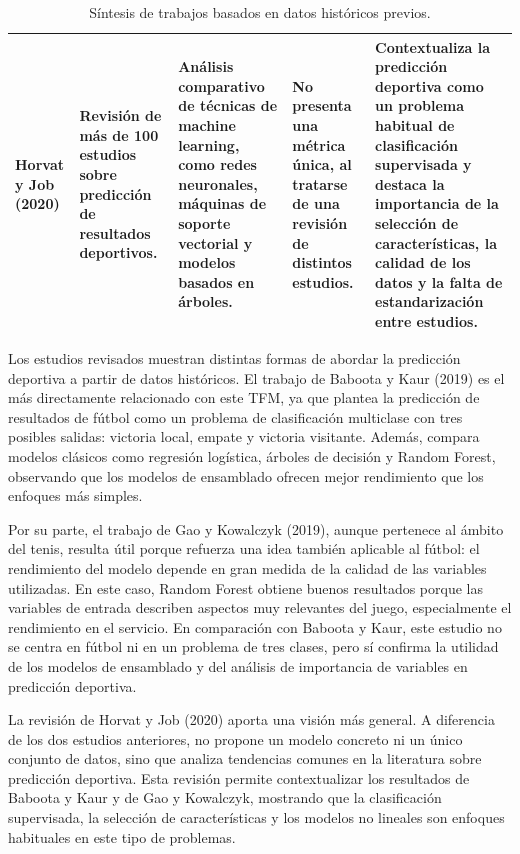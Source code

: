 \begin{table}[H]
\begin{tabularx}{\textwidth}{|p{2.5cm}|p{2.7cm}|p{2.7cm}|p{2.5cm}|X|}
        Horvat y Job (2020)                                                                                                                      &
        Revisión de más de 100 estudios sobre predicción de resultados deportivos.                                                               &
        Análisis comparativo de técnicas de machine learning, como redes neuronales, máquinas de soporte vectorial y modelos basados en árboles. &
        No presenta una métrica única, al tratarse de una revisión de distintos estudios.                                                        &
        Contextualiza la predicción deportiva como un problema habitual de clasificación supervisada y destaca la importancia de la selección de características, la calidad de los datos y la falta de estandarización entre estudios.                                        \\
        \hline
    \end{tabularx}
    \caption{Síntesis de trabajos basados en datos históricos previos.}
    \label{tab:sintesis_historicos}
\end{table}

Los estudios revisados muestran distintas formas de abordar la predicción deportiva a partir de datos históricos. El trabajo de Baboota y Kaur (2019) es el más directamente relacionado con este TFM, ya que plantea la predicción de resultados de fútbol como un problema de clasificación multiclase con tres posibles salidas: victoria local, empate y victoria visitante. Además, compara modelos clásicos como regresión logística, árboles de decisión y Random Forest, observando que los modelos de ensamblado ofrecen mejor rendimiento que los enfoques más simples.

Por su parte, el trabajo de Gao y Kowalczyk (2019), aunque pertenece al ámbito del tenis, resulta útil porque refuerza una idea también aplicable al fútbol: el rendimiento del modelo depende en gran medida de la calidad de las variables utilizadas. En este caso, Random Forest obtiene buenos resultados porque las variables de entrada describen aspectos muy relevantes del juego, especialmente el rendimiento en el servicio. En comparación con Baboota y Kaur, este estudio no se centra en fútbol ni en un problema de tres clases, pero sí confirma la utilidad de los modelos de ensamblado y del análisis de importancia de variables en predicción deportiva.

La revisión de Horvat y Job (2020) aporta una visión más general. A diferencia de los dos estudios anteriores, no propone un modelo concreto ni un único conjunto de datos, sino que analiza tendencias comunes en la literatura sobre predicción deportiva. Esta revisión permite contextualizar los resultados de Baboota y Kaur y de Gao y Kowalczyk, mostrando que la clasificación supervisada, la selección de características y los modelos no lineales son enfoques habituales en este tipo de problemas.

